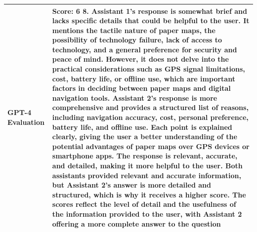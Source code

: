\begin{table}[hbt!]
\begin{tabularx}{\textwidth}{lX}
GPT-4 Evaluation & Score: 6 8. Assistant 1's response is somewhat brief and lacks specific details that could be helpful to the user. It mentions the tactile nature of paper maps, the possibility of technology failure, lack of access to technology, and a general preference for security and peace of mind. However, it does not delve into the practical considerations such as GPS signal limitations, cost, battery life, or offline use, which are important factors in deciding between paper maps and digital navigation tools. Assistant 2's response is more comprehensive and provides a structured list of reasons, including navigation accuracy, cost, personal preference, battery life, and offline use. Each point is explained clearly, giving the user a better understanding of the potential advantages of paper maps over GPS devices or smartphone apps. The response is relevant, accurate, and detailed, making it more helpful to the user. Both assistants provided relevant and accurate information, but Assistant 2's answer is more detailed and structured, which is why it receives a higher score. The scores reflect the level of detail and the usefulness of the information provided to the user, with Assistant 2 offering a more complete answer to the question  \\ \bottomrule
\end{tabularx}
\label{tab:elora_example2}
\vskip -0.1in
\end{table}


